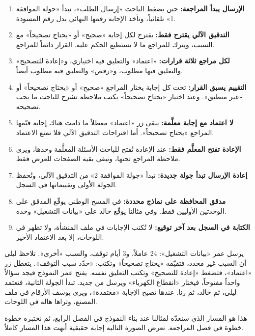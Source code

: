 \begin{enumerate}
\item \textbf{الإرسال يبدأ المراجعة:} حين يضغط الباحث «إرسال الطلب»، تبدأ «جولة الموافقة 1» تلقائياً، وتأخذ الإجابة رقمها النهائي بدل رقم المسودة.
\item \textbf{التدقيق الآلي يقترح فقط:} يقترح لكل إجابة «صحيح» أو «يحتاج تصحيحاً» مع السبب، ويترك للمراجع ما لا يستطيع الحكم عليه. القرار دائماً للمراجع.
\item \textbf{لكل مراجع ثلاثة قرارات:} «اعتماد» والتعليق فيه اختياري، و«إعادة للتصحيح» والتعليق فيها مطلوب، و«رفض» والتعليق فيه مطلوب أيضاً.
\item \textbf{التقييم يسبق القرار:} تحت كل إجابة يختار المراجع «صحيح» أو «يحتاج تصحيحاً» أو «غير منطبق». وعند اختيار «يحتاج تصحيحاً» يكتب ملاحظة تشرح للباحث ما يجب تصحيحه.
\item \textbf{لا اعتماد مع إجابة معلَّمة:} يبقى زر «اعتماد» معطلاً ما دامت هناك إجابة قيّمها المراجع «يحتاج تصحيحاً». أما اقتراحات التدقيق الآلي فلا تمنع الاعتماد.
\item \textbf{الإعادة تفتح المعلَّم فقط:} عند الإعادة تُفتح للباحث الأسئلة المعلَّمة وحدها، ويرى ملاحظة المراجع تحتها، وتبقى بقية الصفحات للعرض فقط.
\item \textbf{إعادة الإرسال تبدأ جولة جديدة:} تبدأ «جولة الموافقة 2» من التدقيق الآلي، وتُحفظ الجولة الأولى وتقييماتها في السجل.
\item \textbf{مدقق المحافظة على نماذج محددة:} في المسح الوطني يوقّع المدقق على الوحدتين الأوليين فقط. وفي مثالنا يوقّع خالد على «بيانات التشغيل» وحده.
\item \textbf{الكتابة في السجل بعد آخر توقيع:} لا تُكتب الإجابات في ملف المنشأة، ولا تظهر في اللوحات، إلا بعد الاعتماد الأخير.
\end{enumerate}

\begin{rcnote}
يرسل عمر «بيانات التشغيل»: 24 عاملاً، و3 أيام توقف، والسبب «أخرى». تلاحظ ليلى أن السبب غير محدد، فتقيّمه «يحتاج تصحيحاً» وتكتب: «حدّد سبب التوقف». يتعطل زر «اعتماد»، فتضغط «إعادة للتصحيح» وتكتب التعليق نفسه. يفتح عمر النموذج فيجد سؤالاً واحداً مفتوحاً، فيختار «انقطاع الكهرباء» ويرسل من جديد. تبدأ الجولة الثانية، فتعتمد ليلى، ثم خالد، ثم رنا. عندها تصبح الإجابة «معتمدة»، ويرى يوسف الأرقام في ملف المصنع، وتراها هالة في اللوحات.
\end{rcnote}

هذا هو المسار الذي سنعدّه لمثالنا عند بناء النموذج في الفصل الرابع، ثم نختبره خطوة خطوة في فصل المراجعة. تعرض الصورة التالية إجابة حقيقية أنهت هذا المسار كاملاً.

